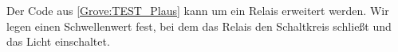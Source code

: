 Der Code aus \ref{Grove:TEST_Plaus} kann um ein Relais erweitert werden. Wir legen einen Schwellenwert fest, bei dem das Relais den Schaltkreis schließt und das Licht einschaltet.

{
	
}


